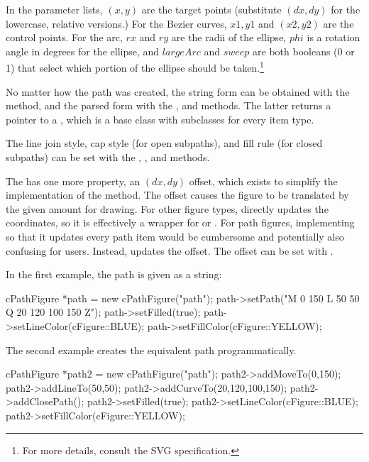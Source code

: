 In the parameter lists, $(x,y)$ are the target points (substitute $(dx,dy)$ for
the lowercase, relative versions.) For the Bezier curves, $x1,y1$ and
$(x2,y2)$ are the control points. For the arc, $rx$ and $ry$ are the radii of the
ellipse, $phi$ is a rotation angle in degrees for the ellipse, and
$largeArc$ and $sweep$ are both booleans (0 or 1) that select which portion
of the ellipse should be taken.\footnote{For more details, consult the SVG
specification.}

No matter how the path was created, the string form can be obtained with the
 method, and the parsed form with the ,
and  methods. The latter returns a pointer to a
, which is a base class with subclasses for every
item type.

The line join style, cap style (for open subpaths), and fill rule (for closed
subpaths) can be set with the ,
, and  methods.

The  has one more property, an $(dx,dy)$ offset, which
exists to simplify the implementation of the  method. The offset
causes the figure to be translated by the given amount for drawing. For
other figure types,  directly updates the coordinates, so it
is effectively a wrapper for  or .
For path figures, implementing  so that it updates every path
item would be cumbersome and potentially also confusing for users. Instead,
 updates the offset. The offset can be set with
.

In the first example, the path is given as a string:


\begin{cpp}
cPathFigure *path = new cPathFigure("path");
path->setPath("M 0 150 L 50 50 Q 20 120 100 150 Z");
path->setFilled(true);
path->setLineColor(cFigure::BLUE);
path->setFillColor(cFigure::YELLOW);
\end{cpp}


The second example creates the equivalent path programmatically.

\begin{cpp}
cPathFigure *path2 = new cPathFigure("path");
path2->addMoveTo(0,150);
path2->addLineTo(50,50);
path2->addCurveTo(20,120,100,150);
path2->addClosePath();
path2->setFilled(true);
path2->setLineColor(cFigure::BLUE);
path2->setFillColor(cFigure::YELLOW);
\end{cpp}

